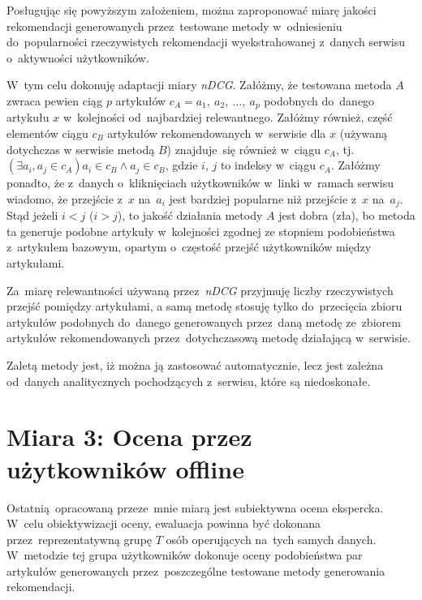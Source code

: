 \documentclass[pl]{minipw} %
\begin{document}
Posługując się powyższym założeniem, można zaproponować miarę jakości rekomendacji generowanych przez~testowane metody w~odniesieniu do~popularności rzeczywistych rekomendacji wyekstrahowanej z~danych serwisu o~aktywności użytkowników.

W~tym celu dokonuję adaptacji miary \textit{nDCG}. Załóżmy, że testowana metoda $A$ zwraca pewien ciąg $p$ artykułów $c_A=a_1,\ a_2,\ ...,\ a_p$ podobnych do~danego artykułu $x$ w~kolejności od~najbardziej relewantnego. Załóżmy również, część elementów ciągu $c_B$ artykułów rekomendowanych w~serwisie dla $x$ (używaną dotychczas w serwisie metodą $B$) znajduje~się również w~ciągu $c_A$, tj. $(\exists{a_i, a_j\in c_A})a_i \in c_B \land a_j \in c_B$, gdzie $i$, $j$ to indeksy w~ciągu $c_A$. Załóżmy ponadto, że z~danych o~kliknięciach użytkowników w~linki w~ramach serwisu wiadomo, że przejście z~$x$ na~$a_i$ jest bardziej popularne niż przejście z~$x$ na~$a_j$. Stąd jeżeli $i<j$ ($i>j$), to jakość działania metody $A$ jest dobra (zła), bo metoda ta generuje podobne artykuły w~kolejności zgodnej ze stopniem podobieństwa z~artykułem bazowym, opartym o~częstość przejść użytkowników między artykułami.

Za~miarę relewantności używaną przez~\textit{nDCG} przyjmuję liczby rzeczywistych przejść pomiędzy artykułami, a samą metodę stosuję tylko do~przecięcia zbioru artykułów podobnych do~danego generowanych przez~daną metodę ze~zbiorem artykułów rekomendowanych przez~dotychczasową metodę działającą w~serwisie.

Zaletą metody jest, iż można ją zastosować automatycznie, lecz jest zależna od~danych analitycznych pochodzących z~serwisu, które są niedoskonałe.

\section{Miara 3: Ocena przez użytkowników offline}

Ostatnią opracowaną przeze~mnie miarą jest subiektywna ocena ekspercka. W~celu obiektywizacji oceny, ewaluacja powinna być dokonana przez~reprezentatywną grupę $T$ osób operujących na~tych samych danych. W~metodzie tej grupa użytkowników dokonuje oceny podobieństwa par artykułów generowanych przez~poszczególne testowane metody generowania rekomendacji.
\end{document}
